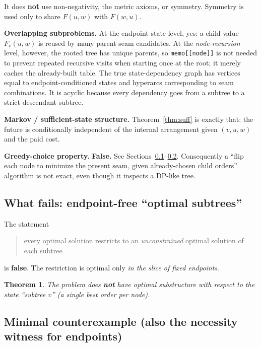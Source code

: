 \documentclass[11pt]{article}
\theoremstyle{plain}
\newtheorem{theorem}{Theorem}[section]
\begin{document}
It does \textbf{not} use non-negativity, the metric axioms, or symmetry.
Symmetry is used only to share \(F(u,w)\) with \(F(w,u)\).

\textbf{Overlapping subproblems.} At the endpoint-state level, yes: a child
value \(F_v(u,w)\) is reused by many parent seam candidates. At the
\emph{node-recursion} level, however, the rooted tree has unique parents, so
\texttt{memo[[node]]} is not needed to prevent repeated recursive visits when
starting once at the root; it merely caches the already-built table. The true
state-dependency graph has vertices equal to endpoint-conditioned states and
hyperarcs corresponding to seam combinations. It is acyclic because every
dependency goes from a subtree to a strict descendant subtree.

\textbf{Markov / sufficient-state structure.} Theorem~\ref{thm:suff} is exactly
that: the future is conditionally independent of the internal arrangement given
\((v,u,w)\) and the paid cost.

\textbf{Greedy-choice property.} \textbf{False.} See
Sections~\ref{sec:fails}--\ref{sec:minimalce}. Consequently a ``flip each node
to minimize the present seam, given already-chosen child orders'' algorithm is
not exact, even though it inspects a DP-like tree.

\subsection{What fails: endpoint-free ``optimal subtrees''}
\label{sec:fails}

The statement

\begin{quote}
every optimal solution restricts to an \emph{unconstrained} optimal solution
of each subtree
\end{quote}

is \textbf{false}. The restriction is optimal only \emph{in the slice of fixed
endpoints}.

\begin{theorem}\label{thm:noendpoint}
The problem does \textbf{not} have optimal substructure with respect to the
state ``subtree \(v\)'' (a single best order per node).
\end{theorem}

\subsection{Minimal counterexample (also the necessity witness for
endpoints)}
\label{sec:minimalce}
\end{document}
